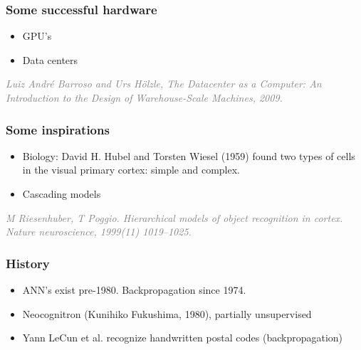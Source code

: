 \documentclass{beamer}
\newcommand\smallgray[1]{\textcolor{gray}{\small\it #1}}
\newcommand\prevwork[1]{\smallgray{#1}}
\begin{document}
\begin{frame}
  \frametitle{Some successful hardware}
  \begin{itemize}
  \item GPU's
  \item Data centers
  \end{itemize}
  
  \prevwork{Luiz André Barroso and Urs Hölzle, The Datacenter as a
    Computer: An Introduction to the Design of Warehouse-Scale
    Machines, 2009.}
\end{frame}

\begin{frame}
  \frametitle{Some inspirations}
  \begin{itemize}
  \item Biology: David H. Hubel and Torsten Wiesel (1959) found two
    types of cells in the visual primary cortex: simple and complex.
  \item Cascading models
  \end{itemize}

\prevwork{M Riesenhuber, T Poggio. Hierarchical models of object
  recognition in cortex. Nature neuroscience, 1999(11) 1019–1025.}
\end{frame}

\begin{frame}
  \frametitle{History}
  \begin{itemize}
  \item<1-> ANN's exist pre-1980.  Backpropagation since 1974.
  \item<2-> Neocognitron (Kunihiko Fukushima, 1980), partially unsupervised
  \item<3-> Yann LeCun et al. recognize handwritten postal codes (backpropagation)
  \end{itemize}

  \visible<1>{\prevwork{P. Werbos., ``Beyond Regression: New Tools for
    Prediction and Analysis in the Behavioral Sciences,'' PhD thesis,
    Harvard University, 1974.}}

\visible<2>{\prevwork{K. Fukushima., ``Neocognitron: A self-organizing
    neural network model for a mechanism of pattern recognition
    unaffected by shift in position,'' Biol. Cybern., 36, 193–202,
    1980.}}

\visible<3>{\prevwork{LeCun et al., ``Backpropagation Applied to
    Handwritten Zip Code Recognition,'' Neural Computation, 1,
    pp. 541–551, 1989.}}
\end{frame}
\end{document}
